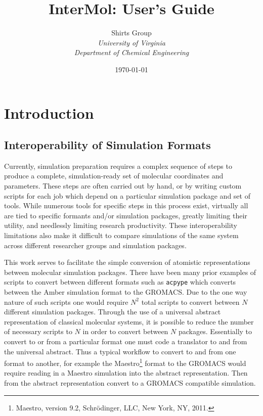 \documentclass[10pt]{book}
\begin{document}
\title{InterMol: User's Guide}
\author{Shirts Group\\
\textit{University of Virginia}\\
\textit{Department of Chemical Engineering}}
\date{\today}
\renewcommand{\thepage}{\arabic{page}}
\maketitle
\tableofcontents
\chapter{Introduction}
\section{Interoperability of Simulation Formats}
\par Currently, simulation preparation requires a complex sequence of steps to produce a complete, simulation-ready set of molecular coordinates and parameters. These steps are often carried out by hand, or by writing custom scripts for each job which depend on a particular simulation package and set of tools. While numerous tools for specific steps in this process exist, virtually all are tied to specific formants and/or simulation packages, greatly limiting their utility, and needlessly limiting research productivity. These interoperability limitations also make it difficult to compare simulations of the same system across different researcher groups and simulation packages.

\par This work serves to facilitate the simple conversion of atomistic representations between molecular simulation packages. There have been many prior examples of scripts to convert between different formats such as {\tt acpype}\cite{SousadaSilva2012} which converts between the Amber simulation format to the GROMACS. Due to the one way nature of such scripts one would require $N^2$ total scripts to convert between $N$ different simulation packages. Through the use of a universal abstract representation of classical molecular systems, it is possible to reduce the number of necessary scripts to $N$ in order to convert between $N$ packages. Essentially to convert to or from a particular format one must code a translator to and from the universal abstract. Thus a typical workflow to convert to and from one format to another, for example the Maestro\footnote{Maestro, version 9.2, Schr\"{o}dinger, LLC, New York, NY, 2011.} format to the GROMACS would require reading in a Maestro simulation into the abstract representation. Then from the abstract representation convert to a GROMACS compatible simulation.
\end{document}

